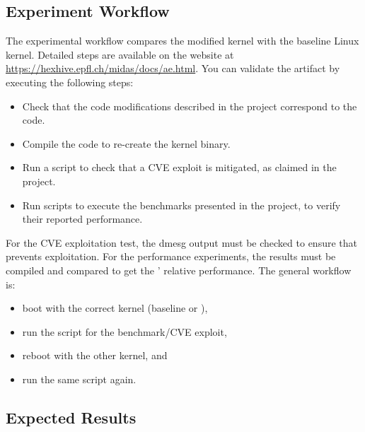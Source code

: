 \subsection{Experiment Workflow}

The experimental workflow compares the modified \midas{} kernel with
the baseline Linux kernel.
Detailed steps are available on the website at 
\url{https://hexhive.epfl.ch/midas/docs/ae.html}.
You can validate the artifact by executing the following steps:
\begin{itemize}
  \item Check that the code modifications described in the project correspond 
  to the code.
  \item Compile the code to re-create the kernel binary.
  \item Run a script to check that a CVE exploit is mitigated, as claimed 
  in the project.
  \item Run scripts to execute the benchmarks presented in the project, 
  to verify their reported performance.
\end{itemize}

For the CVE exploitation test, the dmesg output must be checked 
to ensure that \midas{} prevents exploitation.
For the performance experiments, the results must be compiled 
and compared to get the \midas{}' relative performance.
The general workflow is:
\begin{itemize}
  \item boot with the correct kernel (baseline or \midas{}),
  \item run the script for the benchmark/CVE exploit,
  \item reboot with the other kernel, and 
  \item run the same script again.
\end{itemize}

\subsection{Expected Results}


